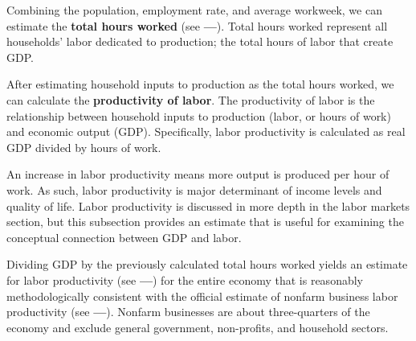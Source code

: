 \documentclass{report}
\begin{document}
\begin{minipage}{1.0\textwidth} 
\small Combining the population, employment rate, and average workweek, we can estimate the \textbf{total hours worked} (see {\color{orange}\textbf{---}}). Total hours worked represent all households' labor dedicated to production; the total hours of labor that create GDP. 
\end{minipage}
\newpage
\begin{minipage}{1.0\textwidth}
 
\small After estimating household inputs to production as the total hours worked, we can calculate the \textbf{productivity of labor}. The productivity of labor is the relationship between household inputs to production (labor, or hours of work) and economic output (GDP). Specifically, labor productivity is calculated as real GDP divided by hours of work. 

An increase in labor productivity means more output is produced per hour of work. As such, labor productivity is major determinant of income levels and quality of life. Labor productivity is discussed in more depth in the labor markets section, but this subsection provides an estimate that is useful for examining the conceptual connection between GDP and labor.

Dividing GDP by the previously calculated total hours worked yields an estimate for labor productivity (see {\color{cyan!60!white}\textbf{---}}) for the entire economy that is reasonably methodologically consistent with the official estimate of nonfarm business labor productivity (see {\color{violet}\textbf{---}}). Nonfarm businesses are about three-quarters of the economy and exclude general government, non-profits, and household sectors. 
\end{minipage}
\vspace{1mm}
\end{document}
